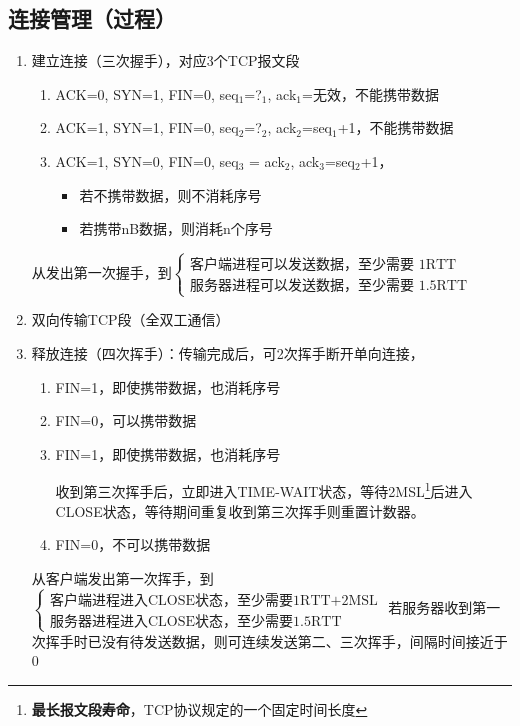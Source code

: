 \subsection{连接管理（过程）}
\begin{enumerate}
    \item 建立连接（三次握手），对应3个TCP报文段\begin{enumerate}
        \item ACK=0, SYN=1, FIN=0, seq\(_1\)=?\(_1\), ack\(_1\)=无效，不能携带数据
        \item ACK=1, SYN=1, FIN=0, seq\(_2\)=?\(_2\), ack\(_2\)=seq\(_1\)+1，不能携带数据
        \item ACK=1, SYN=0, FIN=0, seq\(_3\) = ack\(_2\), ack\(_3\)=seq\(_2\)+1，\begin{itemize}
            \item 若不携带数据，则不消耗序号
            \item 若携带nB数据，则消耗n个序号
        \end{itemize}
    \end{enumerate}
    从发出第一次握手，到\(\begin{cases}
        \text{客户端进程可以发送数据，至少需要 1RTT} \\ 
        \text{服务器进程可以发送数据，至少需要 1.5RTT}
    \end{cases}\)
    \item 双向传输TCP段（全双工通信）
    \item 释放连接（四次挥手）：传输完成后，可2次挥手断开单向连接，\begin{enumerate}
        \item FIN=1，即使携带数据，也消耗序号
        \item FIN=0，可以携带数据
        \item FIN=1，即使携带数据，也消耗序号

        收到第三次挥手后，立即进入TIME-WAIT状态，等待2MSL\footnote{\textbf{最长报文段寿命}，TCP协议规定的一个固定时间长度}后进入CLOSE状态，等待期间重复收到第三次挥手则重置计数器。
        \item FIN=0，不可以携带数据
    \end{enumerate}
    从客户端发出第一次挥手，到\(\begin{cases}
        \text{客户端进程进入CLOSE状态，至少需要1RTT+2MSL} \\ 
        \text{服务器进程进入CLOSE状态，至少需要1.5RTT}
    \end{cases}\)
    若服务器收到第一次挥手时已没有待发送数据，则可连续发送第二、三次挥手，间隔时间接近于0
\end{enumerate}

